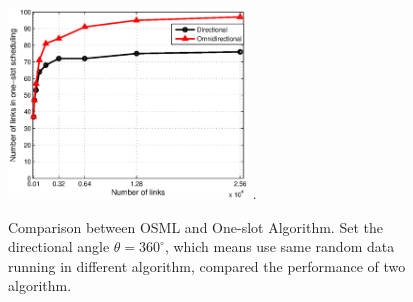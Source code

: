 \documentclass[conference]{IEEEtran}
\begin{document}
\begin{figure}[!t]
\centering
\includegraphics[width=2.5in]{image/6.eps}
\DeclareGraphicsExtensions.
\caption{Comparison between OSML and One-slot Algorithm. Set the directional angle $\theta=360^{\circ}$, which means use same random data running in different algorithm, compared the performance of two algorithm.}
\label{Comparison between OSML and One-slot Algorithm 2}
\end{figure}
%
%

\end{document}
